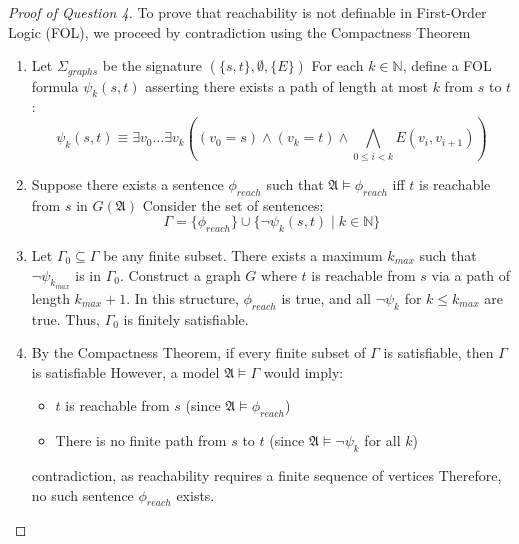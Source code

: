 \documentclass{article}
\begin{document}
\begin{proof}[Proof of Question 4]
    To prove that reachability is not definable in First-Order Logic (FOL), we proceed by contradiction using the Compactness Theorem
    
    \begin{enumerate}
        \item
        Let $\Sigma_{graphs}$ be the signature $( \{s, t\}, \emptyset, \{E\} )$
        For each $k \in \mathbb{N}$, define a FOL formula $\psi_k(s, t)$ asserting there exists a path of length at most $k$ from $s$ to $t$:
        \[ \psi_k(s, t) \equiv \exists v_0 \dots \exists v_k \left( (v_0 = s) \wedge (v_k = t) \wedge \bigwedge_{0 \le i < k} E(v_i, v_{i+1}) \right) \]
    
        \item 
        Suppose there exists a sentence $\phi_{reach}$ such that $\mathfrak{A} \models \phi_{reach}$ iff $t$ is reachable from $s$ in $G(\mathfrak{A})$
        Consider the set of sentences:
        \[ \Gamma = \{ \phi_{reach} \} \cup \{ \neg \psi_k(s, t) \mid k \in \mathbb{N} \} \]
    
        \item 
        Let $\Gamma_0 \subseteq \Gamma$ be any finite subset. There exists a maximum $k_{max}$ such that $\neg \psi_{k_{max}}$ is in $\Gamma_0$.
        Construct a graph $G$ where $t$ is reachable from $s$ via a path of length $k_{max} + 1$. 
        In this structure, $\phi_{reach}$ is true, and all $\neg \psi_k$ for $k \le k_{max}$ are true. 
        Thus, $\Gamma_0$ is finitely satisfiable.
    
        \item
        By the Compactness Theorem, if every finite subset of $\Gamma$ is satisfiable, then $\Gamma$ is satisfiable
        However, a model $\mathfrak{A} \models \Gamma$ would imply:
        \begin{itemize}
            \item $t$ is reachable from $s$ (since $\mathfrak{A} \models \phi_{reach}$)
            \item There is no finite path from $s$ to $t$ (since $\mathfrak{A} \models \neg \psi_k$ for all $k$)
        \end{itemize}
        contradiction, as reachability requires a finite sequence of vertices
        Therefore, no such sentence $\phi_{reach}$ exists.
    \end{enumerate}
    \end{proof}
\end{document}
